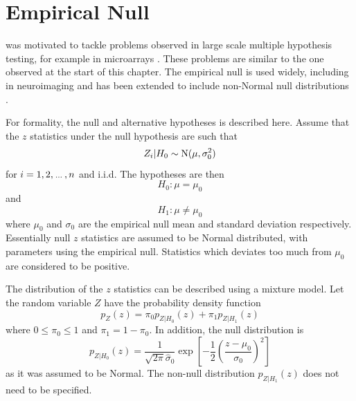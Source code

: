 \section{Empirical Null}

\cite{efron2004large} was motivated to tackle problems observed in large scale multiple hypothesis testing, for example in microarrays \citep{hedenfalk2001gene, efron2002empirical, efron2003robbins}. These problems are similar to the one observed at the start of this chapter. The empirical null is used widely, including in neuroimaging \citep{schwartzman2008false, schwartzman2009empirical} and has been extended to include non-Normal null distributions \citep{schwartzman2008false, schwartzman2008empirical}.

For formality, the null and alternative hypotheses is described here. Assume that the $z$ statistics under the null hypothesis are such that
\begin{equation}
	Z_i|H_0\sim\operatorname{N}(\mu,\sigma_0^2)
\end{equation}
for $i=1,2,\dotdotdot,n$ and i.i.d. The hypotheses are then
\begin{equation}
	H_0:\mu = \mu_0
\end{equation}
and
\begin{equation}
	H_1:\mu\neq\mu_0
\end{equation}
where $\mu_0$ and $\sigma_0$ are the empirical null mean and standard deviation respectively. Essentially null $z$ statistics are assumed to be Normal distributed, with parameters using the empirical null. Statistics which deviates too much from $\mu_0$ are considered to be positive.

The distribution of the $z$ statistics can be described using a mixture model. Let the random variable $Z$ have the probability density function
\begin{equation}
	p_Z(z) =
	\pi_0 p_{Z|H_0}(z) + \pi_1 p_{Z|H_1}(z)
\end{equation}
where $0\leqslant\pi_0\leqslant 1$ and  $\pi_1 = 1-\pi_0$. In addition, the null distribution is
\begin{equation}
	p_{Z|H_0}(z) = 
	\dfrac{1}{\sqrt{2\pi}\widehat{\sigma}_0}
	\exp\left[
		-\dfrac{1}{2}
		\left(
			\dfrac{z-{\mu}_0}{{\sigma}_0}
		\right)^2
	\right]
\end{equation}
as it was assumed to be Normal. The non-null distribution $p_{Z|H_1}(z)$ does not need to be specified.

